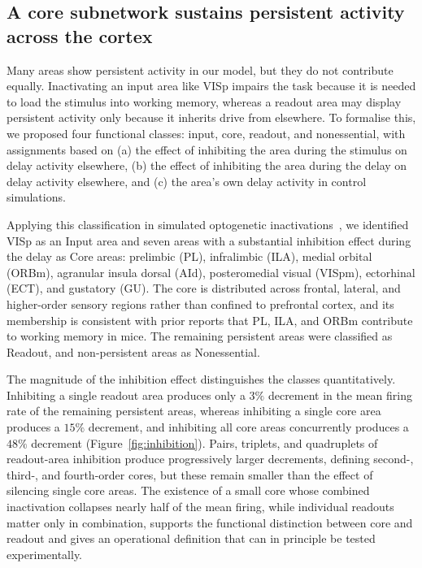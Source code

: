 \documentclass[11pt]{article}
\begin{document}
\subsection{A core subnetwork sustains persistent activity across the cortex}

Many areas show persistent activity in our model, but they do not contribute equally. Inactivating an input area like VISp impairs the task because it is needed to load the stimulus into working memory, whereas a readout area may display persistent activity only because it inherits drive from elsewhere. To formalise this, we proposed four functional classes: input, core, readout, and nonessential, with assignments based on (a) the effect of inhibiting the area during the stimulus on delay activity elsewhere, (b) the effect of inhibiting the area during the delay on delay activity elsewhere, and (c) the area's own delay activity in control simulations.

Applying this classification in simulated optogenetic inactivations~\cite{guo2017maintenance,bolkan2017thalamic}, we identified VISp as an Input area and seven areas with a substantial inhibition effect during the delay as Core areas: prelimbic (PL), infralimbic (ILA), medial orbital (ORBm), agranular insula dorsal (AId), posteromedial visual (VISpm), ectorhinal (ECT), and gustatory (GU). The core is distributed across frontal, lateral, and higher-order sensory regions rather than confined to prefrontal cortex, and its membership is consistent with prior reports that PL, ILA, and ORBm contribute to working memory in mice. The remaining persistent areas were classified as Readout, and non-persistent areas as Nonessential.

The magnitude of the inhibition effect distinguishes the classes quantitatively. Inhibiting a single readout area produces only a $3\%$ decrement in the mean firing rate of the remaining persistent areas, whereas inhibiting a single core area produces a $15\%$ decrement, and inhibiting all core areas concurrently produces a $48\%$ decrement (Figure~\ref{fig:inhibition}). Pairs, triplets, and quadruplets of readout-area inhibition produce progressively larger decrements, defining second-, third-, and fourth-order cores, but these remain smaller than the effect of silencing single core areas. The existence of a small core whose combined inactivation collapses nearly half of the mean firing, while individual readouts matter only in combination, supports the functional distinction between core and readout and gives an operational definition that can in principle be tested experimentally.
\end{document}
